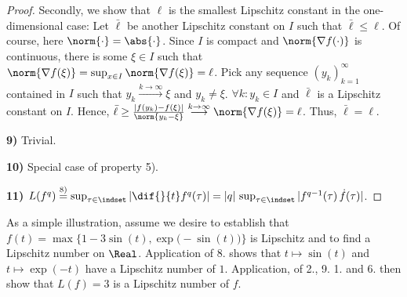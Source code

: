 \begin{lem}
\begin{proof}
Secondly, we show that $\ell$ is the smallest Lipschitz constant in the one-dimensional case: Let $\bar \ell$ be another Lipschitz constant on $I$ such that $\bar \ell \leq \ell$. Of course, here $\norm{\cdot} = \abs{\cdot}$. Since $I$ is compact and $\norm{\nabla f(\cdot) }$ is continuous, there is some $\xi \in I$ such that $\norm{\nabla f(\xi)} = \sup_{x \in I} \norm{\nabla f(\xi)} = \ell$. Pick any sequence $(y_k)_{k=1}^\infty$ contained in $I$ such that $y_k \stackrel{k \to \infty}{\longrightarrow} \xi$ and $y_k \neq \xi$.
$\forall k: y_k \in I $ and $\bar \ell$ is a Lipschitz constant on $I$. Hence, $ \bar \ell \geq \frac{|f(y_k) - f(\xi)|}{\norm{y_k-\xi}}\stackrel{k \to \infty}{\longrightarrow} \norm{ \nabla f(\xi)} = \ell$. Thus, $\bar \ell = \ell$.

\textbf{9)} Trivial. 

\textbf{10)} Special case of property 5).

\textbf{11)} $L(f^q) \stackrel{8)}{=} \sup_{\tau \in \indset } |\dif{}{t} f^q(\tau)| = |q| \,\sup_{\tau \in \indset } |f^{q-1}(\tau) \, \dot f(\tau)| $. 
\end{proof}
\end{lem} 

As a simple illustration, assume we desire to establish that $f(t) = \max\{ 1- 3 \sin(t), \exp\bigl(- \sin(t) \bigr)\}$ is Lipschitz and to find a Lipschitz number on $\Real$. Application of 8. shows that $t \mapsto \sin(t)$ and $t \mapsto \exp(- t)$ have a Lipschitz number of $1$. Application, of 2., 9. 1. and 6. then show that $L(f) =3$ is a Lipschitz number of $f$.



